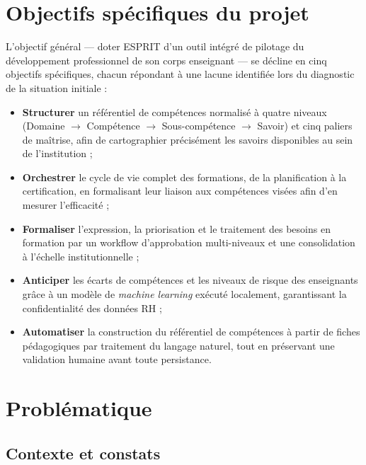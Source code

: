 \documentclass[12pt,a4paper]{report}
\begin{document}
\section{Objectifs spécifiques du projet}

L'objectif général — doter ESPRIT d'un outil intégré de pilotage du
développement professionnel de son corps enseignant — se décline en cinq
objectifs spécifiques, chacun répondant à une lacune identifiée lors du
diagnostic de la situation initiale :

\begin{itemize}[leftmargin=1.2cm]
  \item \textbf{Structurer} un référentiel de compétences normalisé à quatre
  niveaux (Domaine $\rightarrow$ Compétence $\rightarrow$ Sous-compétence
  $\rightarrow$ Savoir) et cinq paliers de maîtrise, afin de cartographier
  précisément les savoirs disponibles au sein de l'institution ;
  \item \textbf{Orchestrer} le cycle de vie complet des formations, de la
  planification à la certification, en formalisant leur liaison aux compétences
  visées afin d'en mesurer l'efficacité ;
  \item \textbf{Formaliser} l'expression, la priorisation et le traitement des
  besoins en formation par un workflow d'approbation multi-niveaux et une
  consolidation à l'échelle institutionnelle ;
  \item \textbf{Anticiper} les écarts de compétences et les niveaux de risque
  des enseignants grâce à un modèle de \textit{machine learning} exécuté
  localement, garantissant la confidentialité des données RH ;
  \item \textbf{Automatiser} la construction du référentiel de compétences à
  partir de fiches pédagogiques par traitement du langage naturel, tout en
  préservant une validation humaine avant toute persistance.
\end{itemize}

\section{Problématique}

\subsection{Contexte et constats}
\end{document}
